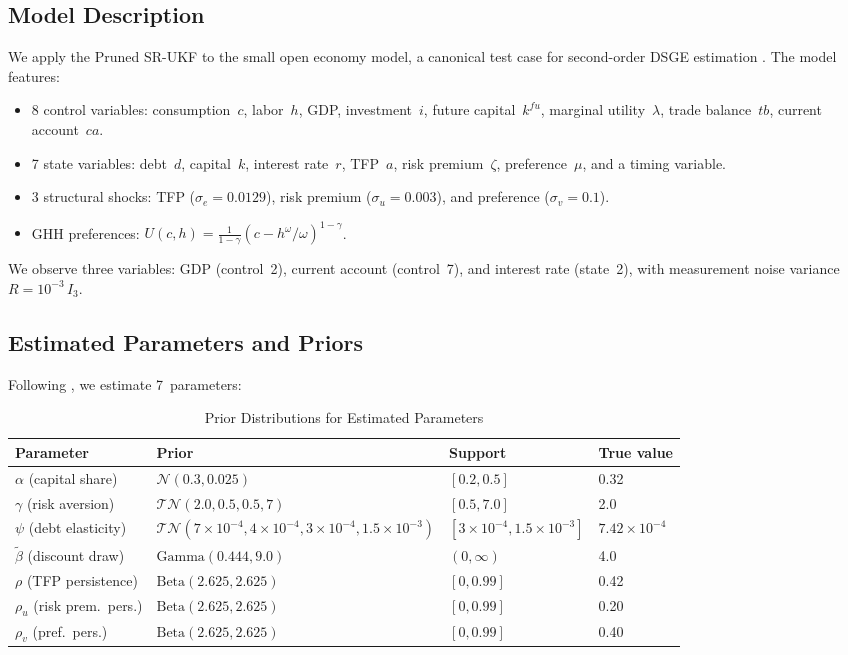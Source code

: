 \documentclass[12pt,a4paper]{article}
\begin{document}
\subsection{Model Description}

We apply the Pruned SR-UKF to the \citet{schmitt2003closing} small
open economy model, a canonical test case for second-order DSGE
estimation \citep{childers2024differentiable}. The model features:
\begin{itemize}[nosep]
\item 8 control variables: consumption~$c$, labor~$h$, GDP,
investment~$i$, future capital~$k^{fu}$, marginal utility~$\lambda$,
trade balance~$tb$, current account~$ca$.
\item 7 state variables: debt~$d$, capital~$k$, interest rate~$r$,
TFP~$a$, risk premium~$\zeta$, preference~$\mu$, and a timing variable.
\item 3 structural shocks: TFP ($\sigma_e = 0.0129$), risk premium
($\sigma_u = 0.003$), and preference ($\sigma_v = 0.1$).
\item GHH preferences:
$U(c, h) = \frac{1}{1-\gamma}(c - h^\omega/\omega)^{1-\gamma}$.
\end{itemize}

We observe three variables: GDP (control~2), current account
(control~7), and interest rate (state~2), with measurement noise
variance $R = 10^{-3}\,I_3$.

\subsection{Estimated Parameters and Priors}

Following \citet{childers2024differentiable}, we estimate 7~parameters:

\begin{table}[htbp]
\centering
\caption{Prior Distributions for Estimated Parameters}
\label{tab:priors}
\begin{tabular}{@{}llll@{}}
\toprule
Parameter & Prior & Support & True value \\
\midrule
$\alpha$ (capital share)
  & $\mathcal{N}(0.3, 0.025)$
  & $[0.2, 0.5]$
  & 0.32 \\
$\gamma$ (risk aversion)
  & $\mathcal{TN}(2.0, 0.5, 0.5, 7)$
  & $[0.5, 7.0]$
  & 2.0 \\
$\psi$ (debt elasticity)
  & $\mathcal{TN}(7{\times}10^{-4}, 4{\times}10^{-4}, 3{\times}10^{-4}, 1.5{\times}10^{-3})$
  & $[3{\times}10^{-4}, 1.5{\times}10^{-3}]$
  & $7.42{\times}10^{-4}$ \\
$\tilde{\beta}$ (discount draw)
  & $\text{Gamma}(0.444, 9.0)$
  & $(0, \infty)$
  & 4.0 \\
$\rho$ (TFP persistence)
  & $\text{Beta}(2.625, 2.625)$
  & $[0, 0.99]$
  & 0.42 \\
$\rho_u$ (risk prem.\ pers.)
  & $\text{Beta}(2.625, 2.625)$
  & $[0, 0.99]$
  & 0.20 \\
$\rho_v$ (pref.\ pers.)
  & $\text{Beta}(2.625, 2.625)$
  & $[0, 0.99]$
  & 0.40 \\
\bottomrule
\end{tabular}
\end{table}
\end{document}
